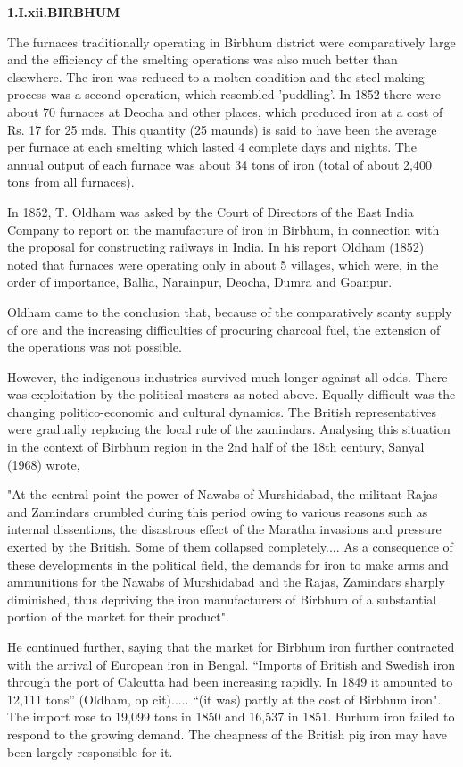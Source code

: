 \textbf{1.I.xii.}\textbf{BIRBHUM}

The furnaces traditionally operating in Birbhum district were comparatively large and the efficiency of the smelting operations was also much better than elsewhere. The iron was reduced to a molten condition and the steel making process was a second operation, which resembled 'puddling'. In 1852 there were about 70 furnaces at Deocha and other places, which produced iron at a cost of Rs. 17 for 25 mds. This quantity (25 maunds) is said to have been the average per furnace at each smelting which lasted 4 complete days and nights. The annual output of each furnace was about 34 tons of iron (total of about 2,400 tons from all furnaces).

In 1852, T. Oldham was asked by the Court of Directors of the East India Company to report on the manufacture of iron in Birbhum, in connection with the proposal for constructing railways in India. In his report Oldham (1852) noted that furnaces were operating only in about 5 villages, which were, in the order of importance, Ballia, Narainpur, Deocha, Dumra and Goanpur.

Oldham came to the conclusion that, because of the comparatively scanty supply of ore and the increasing difficulties of procuring charcoal fuel, the extension of the operations was not possible.

However, the indigenous industries survived much longer against all odds. There was exploitation by the political masters as noted above. Equally difficult was the changing politico-economic and cultural dynamics. The British representatives were gradually replacing the local rule of the zamindars. Analysing this situation in the context of Birbhum region in the 2nd half of the 18th century, Sanyal (1968) wrote,

"At the central point the power of Nawabs of Murshidabad, the militant Rajas and Zamindars crumbled during this period owing to various reasons such as internal dissentions, the disastrous effect of the Maratha invasions and pressure exerted by the British. Some of them collapsed completely.... As a consequence of these developments in the political field, the demands for iron to make arms and ammunitions for the Nawabs of Murshidabad and the Rajas, Zamindars sharply diminished, thus depriving the iron manufacturers of Birbhum of a substantial portion of the market for their product".

He continued further, saying that the market for Birbhum iron further contracted with the arrival of European iron in Bengal. “Imports of British and Swedish iron through the port of Calcutta had been increasing rapidly. In 1849 it amounted to 12,111 tons” (Oldham, op cit)..... “(it was) partly at the cost of Birbhum iron". The import rose to 19,099 tons in 1850 and 16,537 in 1851. Burhum iron failed to respond to the growing demand. The cheapness of the British pig iron may have been largely responsible for it.

